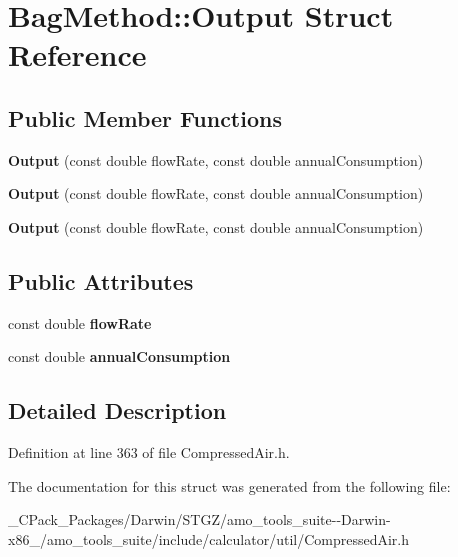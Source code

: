 \hypertarget{struct_bag_method_1_1_output}{}\section{Bag\+Method\+:\+:Output Struct Reference}
\label{struct_bag_method_1_1_output}
\subsection*{Public Member Functions}
\begin{DoxyCompactItemize}
\item 
\mbox{\label{struct_bag_method_1_1_output_a32476edc4a2b924580f0976732cb9aa0}} 
{\bfseries Output} (const double flow\+Rate, const double annual\+Consumption)
\item 
\mbox{\label{struct_bag_method_1_1_output_a32476edc4a2b924580f0976732cb9aa0}} 
{\bfseries Output} (const double flow\+Rate, const double annual\+Consumption)
\item 
\mbox{\label{struct_bag_method_1_1_output_a32476edc4a2b924580f0976732cb9aa0}} 
{\bfseries Output} (const double flow\+Rate, const double annual\+Consumption)
\end{DoxyCompactItemize}
\subsection*{Public Attributes}
\begin{DoxyCompactItemize}
\item 
\mbox{\label{struct_bag_method_1_1_output_a6625c932cfa3935a7198b8ed1747955f}} 
const double {\bfseries flow\+Rate}
\item 
\mbox{\label{struct_bag_method_1_1_output_ae287da01450815f1cc6d22b39944482a}} 
const double {\bfseries annual\+Consumption}
\end{DoxyCompactItemize}


\subsection{Detailed Description}


Definition at line 363 of file Compressed\+Air.\+h.



The documentation for this struct was generated from the following file\+:\begin{DoxyCompactItemize}
\item 
\+\_\+\+C\+Pack\+\_\+\+Packages/\+Darwin/\+S\+T\+G\+Z/amo\+\_\+tools\+\_\+suite-\/-\/\+Darwin-\/x86\+\_/amo\+\_\+tools\+\_\+suite/include/calculator/util/Compressed\+Air.\+h\end{DoxyCompactItemize}
